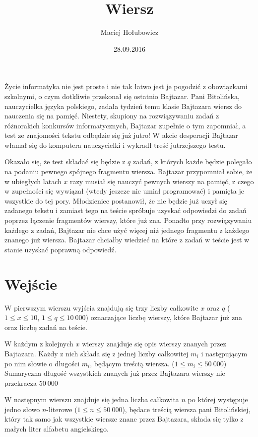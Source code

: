 \documentclass[zad,zawodnik,utf8]{sinol}
\title{Wiersz}
\author{Maciej Hołubowicz} %
\date{28.09.2016}
\begin{document}
\begin{tasktext}%

Życie informatyka nie jest proste i nie tak łatwo jest je pogodzić z obowiązkami szkolnymi, o czym dotkliwie przekonał się ostatnio Bajtazar. Pani Bitolińska, nauczycielka języka polskiego, zadała tydzień temu klasie Bajtazara wiersz do nauczenia się na pamięć. Niestety, skupiony na rozwiązywaniu zadań z różnorakich konkursów informatycznych, Bajtazar zupełnie o tym zapomniał, a test ze znajomości tekstu odbędzie się już jutro! W akcie desperacji Bajtazar włamał się do komputera nauczycielki i wykradł treść jutrzejszego testu. 

Okazało się, że test składać się będzie z $q$ zadań, z których każde będzie polegało na podaniu pewnego spójnego fragmentu wiersza. Bajtazar przypomniał sobie, że w ubiegłych latach $x$ razy musiał się nauczyć pewnych wierszy na pamięć, z czego w zupełności się wywiązał (wtedy jeszcze nie umiał programować) i pamięta je wszystkie do tej pory. Młodzieniec postanowił, że nie będzie już uczył się zadanego tekstu i zamiast tego na teście spróbuje uzyskać odpowiedzi do zadań poprzez łączenie fragmentów wierszy, które już zna. Ponadto przy rozwiązywaniu każdego z zadań, Bajtazar nie chce użyć więcej niż jednego fragmentu z każdego znanego już wiersza. Bajtazar chciałby wiedzieć na które z zadań w teście jest w stanie uzyskać poprawną odpowiedź.

  \section{Wejście}

W pierwszym wierszu wyjścia znajdują się trzy liczby całkowite $x$ oraz $q$ ($1 \leq x \leq 10$, $1 \leq q \leq 10~000$) oznaczające liczbę wierszy, które Bajtazar już zna oraz liczbę zadań na teście.

W każdym z kolejnych $x$ wierszy znajduje się opis wierszy znanych przez Bajtazara. Każdy z nich składa się z jednej liczby całkowitej $m_i$ i następującym po nim słowie o długości $m_i$, będącym treścią wiersza. ($1 \leq m_i \leq 50~000$) Sumaryczna długość wszystkich znanych już przez Bajtazara wierszy nie przekracza $50~000$

W następnym wierszu znajduje się jedna liczba całkowita $n$ po której występuje jedno słowo $n$-literowe ($1 \leq n \leq 50~000$), będace treścią wiersza pani Bitolińskiej, który tak samo jak wszystkie wiersze znane przez Bajtazara, składa się tylko z małych liter alfabetu angielskiego.


\end{tasktext}
\end{document}
